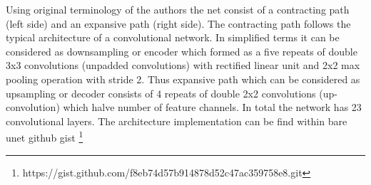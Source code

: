 Using original terminology of the authors \cite{Ronneberger2015} the net consist of a contracting path (left side) and an expansive path (right side). The contracting path follows the typical architecture of a convolutional network. In simplified terms it can be considered as downsampling or encoder which formed as
a five repeats of double 3x3 convolutions (unpadded convolutions) with rectified linear unit and 2x2 max pooling operation with stride 2. Thus expansive path which can be considered as upsampling or decoder consists of 4 repeats of double 2x2 convolutions (up-convolution) which halve number of feature channels. In total the network has 23 convolutional layers. The architecture implementation can be find within bare unet github gist \footnote{https://gist.github.com/f8eb74d57b914878d52c47ac359758e8.git}

